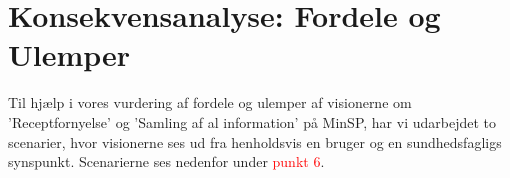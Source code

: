 %
%
%
\section{Konsekvensanalyse: Fordele og Ulemper}
Til hjælp i vores vurdering af fordele og ulemper af visionerne om 'Receptfornyelse' og 'Samling af al information' på MinSP, har vi udarbejdet to scenarier, hvor visionerne ses ud fra henholdsvis en bruger og en sundhedsfagligs synspunkt. Scenarierne ses nedenfor under \textcolor{red}{punkt 6}.
